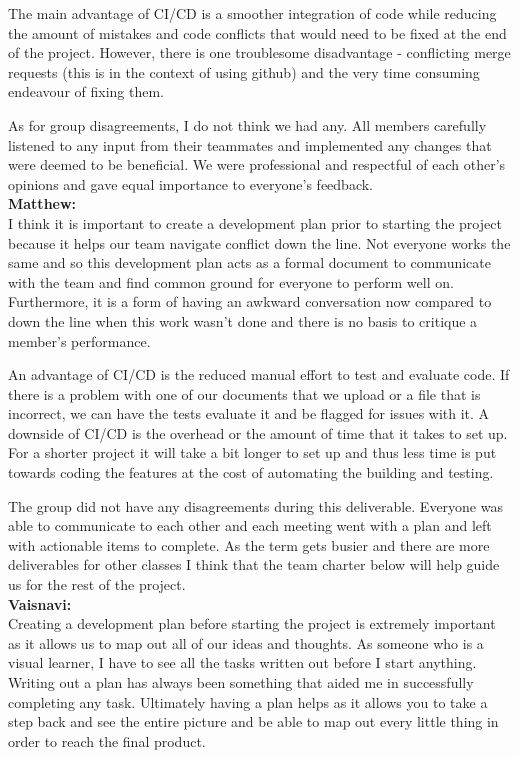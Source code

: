 \documentclass{article}
\begin{document}
The main advantage of CI/CD is a smoother integration of code while reducing the amount of mistakes and code conflicts that would need to be fixed at the end of the project. However, there is one troublesome disadvantage - conflicting merge requests (this is in the context of using github) and the very time consuming endeavour of fixing them. 

As for group disagreements, I do not think we had any. All members carefully listened to any input from their teammates and implemented any changes that were deemed to be beneficial. We were professional and respectful of each other’s opinions and gave equal importance to everyone’s feedback. \\


\noindent \textbf{Matthew:}\\
I think it is important to create a development plan prior to starting the project because it helps our team navigate conflict down the line. Not everyone works the same and so this development plan acts as a formal document to communicate with the team and find common ground for everyone to perform well on. Furthermore, it is a form of having an awkward conversation now compared to down the line when this work wasn't done and there is no basis to critique a member's performance. 

An advantage of CI/CD is the reduced manual effort to test and evaluate code. If there is a problem with one of our documents that we upload or a file that is incorrect, we can have the tests evaluate it and be flagged for issues with it. A downside of CI/CD is the overhead or the amount of time that it takes to set up. For a shorter project it will take a bit longer to set up and thus less time is put towards coding the features at the cost of automating the building and testing.

The group did not have any disagreements during this deliverable. Everyone was able to communicate to each other and each meeting went with a plan and left with actionable items to complete. As the term gets busier and there are more deliverables for other classes I think that the team charter below will help guide us for the rest of the project. \\

\noindent \textbf{Vaisnavi:} \\
Creating a development plan before starting the project is extremely important as it allows us to map out all of our ideas and thoughts. As someone who is a visual learner, I have to see all the tasks written out before I start anything. Writing out a plan has always been something that aided me in successfully completing any task. Ultimately having a plan helps as it allows you to take a step back and see the entire picture and be able to map out every little thing in order to reach the final product.
\end{document}
